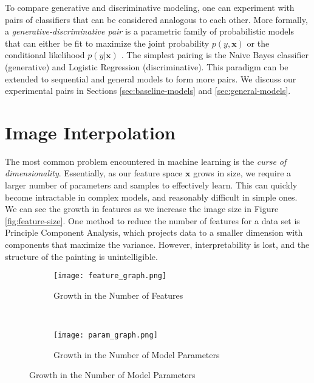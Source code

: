 \documentclass{article}
\begin{document}
To compare generative and discriminative modeling, one can experiment
with pairs of classifiers that can be considered analogous to each other.
More formally, a \textit{generative-discriminative pair} is a parametric
family of probabilistic models that can either be fit to maximize the joint
probability $p(y, \mathbf{x})$ or the conditional
likelihood $p(y | \mathbf{x})$ \cite{NgJordan}. The simplest pairing is
the Naive Bayes classifier (generative) and Logistic Regression
(discriminative). This paradigm can be extended to sequential and general
models to form more pairs. We discuss our experimental pairs
in Sections \ref{sec:baseline-models} and \ref{sec:general-models}.




\section{Image Interpolation}
\label{sec:img-interpolation}
The most common problem encountered in machine learning is the
\textit{curse of dimensionality}. Essentially, as our feature space
$\mathbf{x}$ grows in size, we require a larger number of parameters and samples
to effectively learn. This can quickly become intractable in complex models, and
reasonably difficult in simple ones. We can see the growth
in features as we increase the image size in Figure \ref{fig:feature-size}.
One method to reduce the number of
features for a data set is Principle Component Analysis, which projects
data to a smaller dimension with components that maximize the variance. However,
interpretability is lost, and the structure of the painting is unintelligible.

\begin{figure}[h!]
  \centering
  \caption{As the image size increases, the problem quickly becomes intractable}
  \label{fig:feature-size}
  \begin{subfigure}[b]{0.45\textwidth}
    \centering
    \texttt{[image: feature\_graph.png]}
    \caption{Growth in the Number of Features}
    \label{fig:feature-graph}
  \end{subfigure}
  ~
  \begin{subfigure}[b]{0.45\textwidth}
    \centering
    \texttt{[image: param\_graph.png]}
    \caption{Growth in the Number of Model Parameters}
    \label{fig:param-graph}
  \end{subfigure}
\end{figure}
\end{document}
